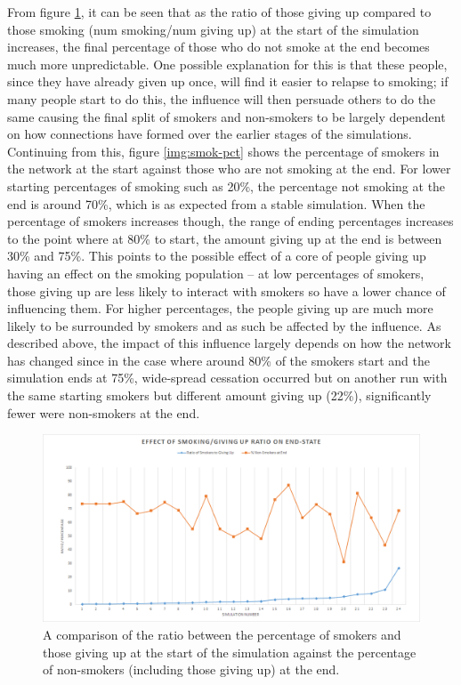 \documentclass[]{report}
\begin{document}
From figure \ref{img:smok-give}, it can be seen that as the ratio of those giving up compared to those smoking (num smoking/num giving up) at the start of the simulation increases, the final percentage of those who do not smoke at the end becomes much more unpredictable. One possible explanation for this is that these people, since they have already given up once, will find it easier to relapse to smoking; if many people start to do this, the influence will then persuade others to do the same causing the final split of smokers and non-smokers to be largely dependent on how connections have formed over the earlier stages of the simulations. Continuing from this, figure \ref{img:smok-pct} shows the percentage of smokers in the network at the start against those who are not smoking at the end. For lower starting percentages of smoking such as 20\%, the percentage not smoking at the end is around 70\%, which is as expected from a stable simulation. When the percentage of smokers increases though, the range of ending percentages increases to the point where at 80\% to start, the amount giving up at the end is between 30\% and 75\%. This points to the possible effect of a core of people giving up having an effect on the smoking population – at low percentages of smokers, those giving up are less likely to interact with smokers so have a lower chance of influencing them. For higher percentages, the people giving up are much more likely to be surrounded by smokers and as such be affected by the influence. As described above, the impact of this influence largely depends on how the network has changed since in the case where around 80\% of the smokers start and the simulation ends at 75\%, wide-spread cessation occurred but on another run with the same starting smokers but different amount giving up (22\%), significantly fewer were non-smokers at the end.

\begin{figure}
\label{img:smok-give}
\begin{center}
\includegraphics[scale=0.5]{smok-giveup.png}
\end{center}
\caption{A comparison of the ratio between the percentage of smokers and those giving up at the start of the simulation against the percentage of non-smokers (including those giving up) at the end.}
\end{figure}
\end{document}

